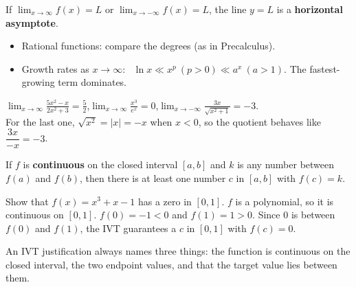 \documentclass[11pt]{article}
\begin{document}
\begin{keyidea}
If $\displaystyle\lim_{x\to\infty}f(x)=L$ or $\displaystyle\lim_{x\to-\infty}f(x)=L$, the line $y=L$ is a \textbf{horizontal asymptote}.
\begin{itemize}
\item Rational functions: compare the degrees (as in Precalculus).
\item Growth rates as $x\to\infty$: \ $\ln x \ll x^p\ (p>0) \ll a^x\ (a>1)$. The fastest-growing term dominates.
\end{itemize}
\end{keyidea}
\begin{example}
$\displaystyle\lim_{x\to\infty}\frac{5x^2-x}{2x^2+3}=\frac52$,\qquad $\displaystyle\lim_{x\to\infty}\frac{x^3}{e^x}=0$,\qquad $\displaystyle\lim_{x\to-\infty}\frac{3x}{\sqrt{x^2+1}}=-3$.\\
For the last one, $\sqrt{x^2}=|x|=-x$ when $x<0$, so the quotient behaves like $\dfrac{3x}{-x}=-3$.
\end{example}

\begin{keyidea}
If $f$ is \textbf{continuous} on the closed interval $[a,b]$ and $k$ is any number between $f(a)$ and $f(b)$, then there is at least one number $c$ in $[a,b]$ with $f(c)=k$.
\end{keyidea}
\begin{example}
Show that $f(x)=x^3+x-1$ has a zero in $[0,1]$.
\sol $f$ is a polynomial, so it is continuous on $[0,1]$. $f(0)=-1<0$ and $f(1)=1>0$. Since $0$ is between $f(0)$ and $f(1)$, the IVT guarantees a $c$ in $[0,1]$ with $f(c)=0$.
\end{example}
\begin{aptip}
An IVT justification always names three things: the function is continuous on the closed interval, the two endpoint values, and that the target value lies between them.
\end{aptip}
\end{document}
